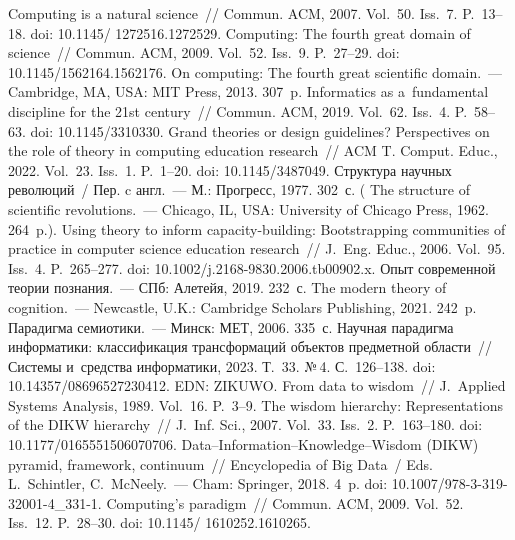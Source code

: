 \begin{multicols}{2}
{{\begin{thebibliography}{99}
 Computing is a natural science~// Commun. ACM, 2007. Vol.~50. Iss.~7. 
P.~13--18. doi: 
10.1145/ 1272516.1272529.
 Computing: The fourth great domain of science~// 
Commun. ACM, 2009. Vol.~52. Iss.~9. P.~27--29. doi: 10.1145/1562164.1562176.
 On computing: The fourth great scientific domain.~--- Cambridge, MA, USA: MIT 
Press, 2013. 307~p.
 Informatics as a~fundamental 
discipline for the 21st century~// Commun. ACM, 2019. Vol.~62. Iss.~4. P.~58--63. doi: 10.1145/3310330.
 Grand theories or design guidelines? Perspectives on the role of theory 
in computing education research~// ACM T. Comput. Educ., 2022. Vol.~23. Iss.~1. P.~1--20. 
doi: 10.1145/3487049.
 Структура научных революций~/ Пер. c англ.~--- М.: Прогресс, 1977. 302~с. 
( The structure of scientific revolutions.~--- Chicago, IL, USA: University of Chicago Press, 
1962. 264~p.).
 Using theory to inform capacity-building: Bootstrapping 
communities of practice in computer science education research~// J.~Eng. Educ., 2006. 
Vol.~95. Iss.~4. P.~265--277. doi: 
10.1002/j.2168-9830.2006.tb00902.x.
 Опыт современной теории познания.~--- СПб: Алетейя, 2019. 
232~с.
 The modern theory of cognition.~--- Newcastle, U.K.: Cambridge 
Scholars Publishing, 2021. 242~p.
 Парадигма семиотики.~--- Минск: МЕТ, 2006. 335~с.
 Научная парадигма информатики: классификация трансформаций 
объектов предметной области~// Системы и~средства информатики, 2023. Т.~33. №\,4.  
С.~126--138. doi: 10.14357/08696527230412. EDN: ZIKUWO.
 From data to wisdom~// J.~Applied Systems Analysis, 1989. Vol.~16. P.~3--9.
 The wisdom hierarchy: Representations of the DIKW hierarchy~// J.~Inf. 
Sci., 2007. Vol.~33. Iss.~2. P.~163--180. doi: 10.1177/0165551506070706.
 Data--Information--Knowledge--Wisdom (DIKW) 
pyramid, framework, continuum~// Encyclopedia of Big Data~/ Eds. L.~Schintler, 
 C.~McNeely.~--- Cham: Springer, 2018. 4~p. doi: 10.1007/978-3-319-32001-4\_\mbox{331-1}.
 Computing's paradigm~// Commun. ACM, 2009. 
Vol.~52. Iss.~12. P.~28--30.  doi: 10.1145/ 1610252.1610265.


\end{thebibliography}}}
\end{multicols}
